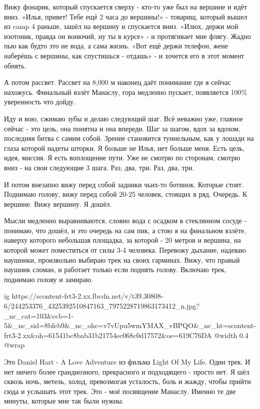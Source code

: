 Вижу фонарик, который спускается сверху - кто-то уже был на вершине и идёт
вниз. «Илья, привет! Тебе ещё 2 часа до вершины!» - товарищ, который вышел из
camp 4 раньше, зашёл на вершину и спускается вниз. «Илюх, держи мой изотоник,
правда он вонючий, ну ты в курсе» - и протягивает мне флягу. Жадно пью как
будто это не вода, а сама жизнь. «Вот ещё держи телефон, жене наберёшь с
вершины, как спустишься - отдашь» - и хочется его в этот момент обнять. 

А потом рассвет. Рассвет на 8,000 м наконец даёт понимание где я сейчас
нахожусь. Финальный взлёт Манаслу, гора медленно пускает, появляется 100\%
уверенность что дойду. 

Иду и вою, сжимаю зубы и делаю следующий шаг. Всё неважно уже, главное сейчас -
это цель, она понятна и она впереди. Шаг за шагом, вдох за вдохом, последняя
битва с самим собой. Зрение становится туннельным, как у лошади на глаза
которой надеты шторки. Я больше не Илья, нет больше меня. Есть цель, идея,
миссия. Я есть воплощение пути. Уже не смотрю по сторонам, смотрю вниз - на
свои следующие 3 шага. Раз, два, три. Раз, два, три. 

И потом внезапно вижу перед собой задники чьих-то ботинок. Которые стоят.
Поднимаю голову, вижу перед собой 20-25 человек, стоящих в ряд. Очередь. К
вершине. Вижу вершину. Я дошёл. 

Мысли медленно выравниваются, словно вода с осадком в стеклянном сосуде -
понимаю, что дошёл, и это очередь на сам пик, а стою я на финальном взлёте,
наверху которого небольшая площадка, за которой - 20 метров и вершина, на
которой может поместиться от силы 3-4 человека. Перевожу дыхание, надеваю
наушники, произвольно выбираю трек на своих гарминах. Вижу, что правый наушник
сломан, и работает только если поднять голову. Включаю трек, поднимаю голову и
замираю. 

\ifcmt
  ig https://scontent-frt3-2.xx.fbcdn.net/v/t39.30808-6/244253376_4325392510847163_7975228719863173412_n.jpg?_nc_cat=103&ccb=1-5&_nc_sid=8bfeb9&_nc_ohc=v7vUpu5wmYMAX_vBPQO&_nc_ht=scontent-frt3-2.xx&oh=61541bc8bab31b21754ec068c0d17572&oe=619C76DA
  @width 0.4
  @wrap 
\fi

Это Daniel Hart - A Love Adventure из фильма Light Of My Life. Один трек. И нет
ничего более грандиозного, прекрасного и подходящего - просто нет. Я шёл сквозь
ночь, метель, холод, превозмогая усталость, боль и жажду, чтобы прийти сюда и
услышать этот трек. Это - моё посвящение Манаслу. Именно те две минуты, которые
мне так были нужны. 

